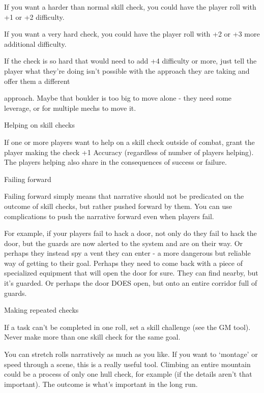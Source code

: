 If you want a harder than normal skill check, you could have the player roll with +1 or +2
difficulty.

If you want a very hard check, you could have the player roll with +2 or +3 more additional
difficulty.


If the check is so hard that would need to add +4 difficulty or more, just tell the player what
they’re doing isn’t possible with the approach they are taking and offer them a different




approach. Maybe that boulder is too big to move alone - they need some leverage, or for
multiple mechs to move it.


                                          Helping on skill checks


If one or more players want to help on a skill check outside of combat, grant the player making
the check +1 Accuracy (regardless of number of players helping). The players helping also share
in the consequences of success or failure.


                                              Failing forward


Failing forward simply means that narrative should not be predicated on the outcome of skill
checks, but rather pushed forward by them. You can use complications to push the narrative
forward even when players fail.

For example, if your players fail to hack a door, not only do they fail to hack the door, but the
guards are now alerted to the system and are on their way. Or perhaps they instead spy a vent
they can enter - a more dangerous but reliable way of getting to their goal. Perhaps they need to
come back with a piece of specialized equipment that will open the door for sure. They can find
nearby, but it’s guarded. Or perhaps the door DOES open, but onto an entire corridor full of
guards.


                                         Making repeated checks

If a task can’t be completed in one roll, set a skill challenge (see the GM tool). Never make more
than one skill check for the same goal.


You can stretch rolls narratively as much as you like. If you want to ‘montage’ or speed through a
scene, this is a really useful tool. Climbing an entire mountain could be a process of only one hull
check, for example (if the details aren’t that important). The outcome is what’s important in the
long run.


